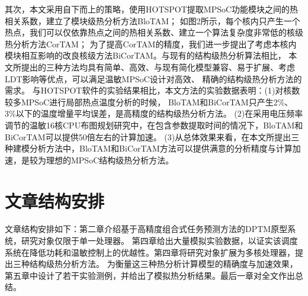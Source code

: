 其次，本文采用自下而上的策略，使用HOTSPOT提取MPSoC功能模块之间的热相关系数，建立了模块级热分析方法BloTAM； 如图2所示，每个核内只产生一个热点，我们可以仅依靠热点之间的热相关系数、建立一个算法复杂度非常低的核级热分析方法CorTAM； 为了提高CorTAM的精度，我们进一步提出了考虑本核内模块相互影响的改良核级方法BiCorTAM。与现有的结构级热分析算法相比， 本文所提出的三种方法均具有简单、高效、与现有简化模型兼容、易于扩展、考虑LDT影响等优点，可以满足温敏MPSoC设计对高效、 精确的结构级热分析方法的需求。
与HOTSPOT软件的实验结果相比，本文方法的实验数据表明：(1)对核数较多MPSoC进行局部热点温度分析的时候， BloTAM和BiCorTAM只产生2\%、3\%以下的温度增量平均误差，是高精度的结构级热分析方法。 (2)在采用电压频率调节的温敏16核CPU布图规划研究中，在包含参数提取时间的情况下，BloTAM和BiCorTAM可以提供50倍左右的计算加速。 (3)从总体效果来看，在本文所提出三种建模分析方法中，BloTAM和BiCorTAM方法可以提供满意的分析精度与计算加速，是较为理想的MPSoC结构级热分析方法。



\section{文章结构安排}
文章结构安排如下：第二章介绍基于高精度组合式任务预测方法的DPTM原型系统，研究对象仅限于单一处理器。 第四章给出大量模拟实验数据，以证实该调度系统在降低功耗和温敏控制上的优越性。第四章将研究对象扩展为多核处理器，提出三种结构级热分析方法。 为衡量这三种热分析计算模型的精确度与加速效果，第五章中设计了若干实验测例，并给出了模拟热分析结果。最后一章对全文作出总结。


